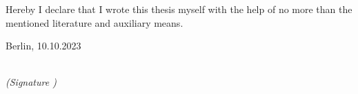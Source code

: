 \newpage

\thispagestyle{empty}

\begin{large}

\vspace*{6cm}

\noindent
Hereby I declare that I wrote this thesis myself with the help of no more than the mentioned literature and auxiliary means.
\vspace{2cm}

\noindent
Berlin, 10.10.2023

\vspace{3cm}

\hspace*{7cm}%
\dotfill\\
\hspace*{8.5cm}%
\textit{(Signature )}

\end{large}
